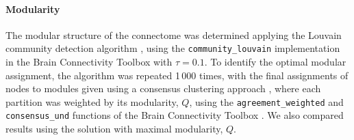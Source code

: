 \documentclass[10pt,letterpaper]{article}
\begin{document}
\paragraph{Modularity}
The modular structure of the connectome was determined applying the Louvain community detection algorithm \cite{Blondel:2008do}, using the \texttt{community\_louvain} implementation in the Brain Connectivity Toolbox \cite{Rubinov2010} with $\tau = 0.1$.
To identify the optimal modular assignment, the algorithm was repeated 1\,000 times, with the final assignments of nodes to modules given using a consensus clustering approach \cite{Lancichinetti2012a}, where each partition was weighted by its modularity, $Q$, using the \texttt{agreement\_weighted} and \texttt{consensus\_und} functions of the Brain Connectivity Toolbox \cite{Rubinov2010}.
We also compared results using the solution with maximal modularity, $Q$.



\end{document}
